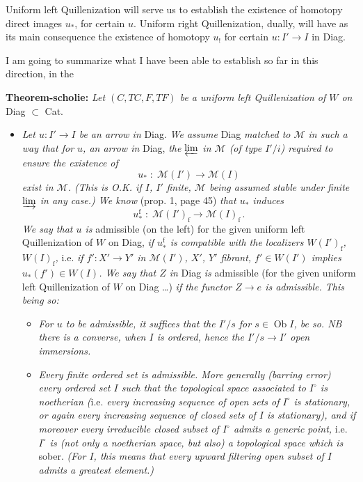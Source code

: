 \documentclass[11pt]{article}
\newcommand{\msp}[1]{\marginpar{\footnotesize [#1]}}
\begin{document}
Uniform left Quillenization will serve us to establish the existence of homotopy direct images $u_{*}$, for certain $u$. Uniform right Quillenization, dually, will have as its main consequence the existence of homotopy $u_{!}$ for certain $u : I' \longrightarrow I$ in Diag.

I am going to summarize what I have been able to establish so far in this direction, in the

\msp{page 59}\textbf{Theorem-scholie:} \textit{Let $(C,TC,F,TF)$ be a uniform left Quillenization of $W$ on} Diag $\subset$ Cat.

\begin{itemize}[leftmargin=3em]
\item[1)] \textit{Let $u : I' \longrightarrow I$ be an arrow in} Diag. \textit{We assume} Diag \textit{matched to $\mathcal{M}$ in such a way that for $u$, an arrow in} Diag, \textit{the $\varprojlim$ in $\mathcal{M}$ (of type $I'/i$) required to ensure the existence of}
\[ u_{*} \;:\; \mathcal{M}(I') \longrightarrow \mathcal{M}(I) \]
\textit{exist in $\mathcal{M}$. (This is O.K. if $I$, $I'$} \textit{finite, $\mathcal{M}$ being assumed stable under finite $\varinjlim$ in any case.) We know} (prop. 1, page 45) \textit{that $u_{*}$ induces}
\[ u_{*}^{\mathrm{f}} \;:\; \mathcal{M}(I')_{\mathrm{f}} \longrightarrow \mathcal{M}(I)_{\mathrm{f}}\,. \tag*{$(*)$} \]
\textit{We say that $u$ is} admissible (on the left) for the given uniform left Quillenization of $W$ on Diag, \textit{if $u_{*}^{\mathrm{f}}$ is compatible with the localizers $W(I')_{\mathrm{f}}$, $W(I)_{\mathrm{f}}$,} i.e. \textit{if $f' : X' \longrightarrow Y'$ in $\mathcal{M}(I')$, $X'$, $Y'$ fibrant, $f' \in W(I')$ implies $u_{*}(f') \in W(I)$. We say that $Z$ in} Diag \textit{is} admissible (for the given uniform left Quillenization of $W$ on Diag \dots) \textit{if the functor $Z \longrightarrow e$ is admissible. This being so:}
\begin{itemize}[leftmargin=2.5em]
\item[a)] \textit{For $u$ to be admissible, it suffices that the $I'/s$ for $s \in \operatorname{Ob} I$, be so. NB there is a converse, when $I$ is ordered, hence the $I'/s \longrightarrow I'$ open immersions.}
\item[b)] \msp{page 60}\textit{Every finite ordered set is admissible. More generally (barring error) every ordered set $I$ such that the topological space associated to $I^{\circ}$ is noetherian (}i.e. \textit{every increasing sequence of open sets of $I^{\circ}$ is stationary, or again every increasing sequence of closed sets of $I$ is stationary), and if moreover every irreducible closed subset of $I^{\circ}$ admits a generic point,} i.e. \textit{$I^{\circ}$ is (not only a noetherian space, but also) a topological space which is} sober. \textit{(For $I$, this means that every upward filtering open subset of $I$ admits a greatest element.)} %
\end{itemize}
\end{itemize}
\end{document}
